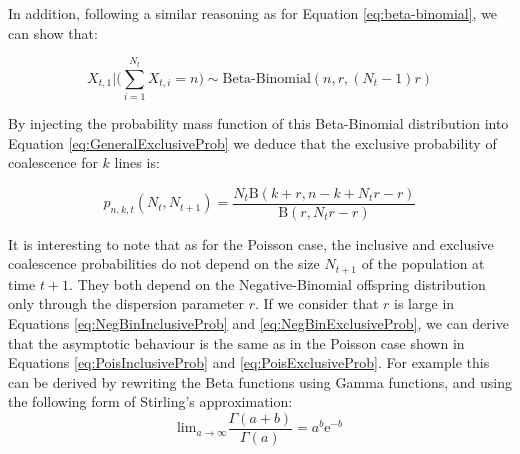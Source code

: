 \documentclass{article}
\renewcommand{\eqref}[1]{\ref{#1}}
\begin{document}
In addition, following a similar reasoning as for
Equation \eqref{eq:beta-binomial}, we can show that:

\begin{equation}
X_{t,1} \bigg| \bigg(\sum_{i=1}^{N_t} X_{t,i} = n \bigg) \sim \text{Beta-Binomial}(n,r, (N_t - 1)r)
\end{equation}

By injecting the probability mass function of this Beta-Binomial distribution into Equation 
\eqref{eq:GeneralExclusiveProb} we deduce that 
the exclusive probability of coalescence for $k$ lines is:

\begin{equation}
p_{n,k,t}(N_t, N_{t+1})=\frac{N_t \mathrm{B}(k+r, n-k+N_t r-r)}{\mathrm{B}(r, N_t r-r)}
\label{eq:NegBinExclusiveProb}
\end{equation}

It is interesting to note that as for the Poisson case, the inclusive and exclusive coalescence probabilities do not depend on the size $N_{t+1}$ of the population at time $t+1$.
They both depend on the 
Negative-Binomial offspring distribution only through the dispersion parameter $r$.
If we consider that $r$ is large in Equations \eqref{eq:NegBinInclusiveProb} and
\eqref{eq:NegBinExclusiveProb}, we can 
derive that the asymptotic behaviour is the same as in the Poisson case  
shown in Equations  \eqref{eq:PoisInclusiveProb} and
\eqref{eq:PoisExclusiveProb}. For example this can be derived by rewriting the
Beta functions using Gamma functions, and using the following form of Stirling's approximation:
\begin{equation}
\mathrm{lim}_{a \rightarrow \infty} \frac{\Gamma(a+b)}{\Gamma(a)}=a^b \mathrm{e}^{-b}
\label{eq:stirling}
\end{equation}
\end{document}
